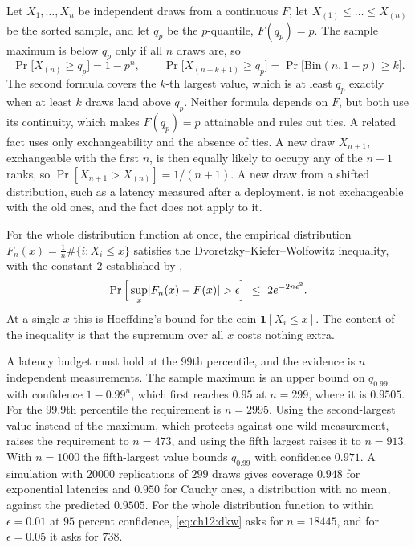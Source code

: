 Let $X_1,\dots,X_n$ be independent draws from a continuous $F$, let $X_{(1)}\le\dots\le X_{(n)}$ be the sorted sample, and let $q_p$ be the $p$-quantile, $F(q_p)=p$. The sample maximum is below $q_p$ only if all $n$ draws are, so
\begin{equation}
\Pr\big[X_{(n)}\ge q_p\big]=1-p^n,
\qquad
\Pr\big[X_{(n-k+1)}\ge q_p\big]=\Pr\big[\mathrm{Bin}(n,1-p)\ge k\big].
\label{eq:ch12:order}
\end{equation}
The second formula covers the $k$-th largest value, which is at least $q_p$ exactly when at least $k$ draws land above $q_p$. Neither formula depends on $F$, but both use its continuity, which makes $F(q_p)=p$ attainable and rules out ties. A related fact uses only exchangeability and the absence of ties. A new draw $X_{n+1}$, exchangeable with the first $n$, is then equally likely to occupy any of the $n+1$ ranks, so $\Pr[X_{n+1}>X_{(n)}]=1/(n+1)$. A new draw from a shifted distribution, such as a latency measured after a deployment, is not exchangeable with the old ones, and the fact does not apply to it.

For the whole distribution function at once, the empirical distribution $F_n(x)=\frac1n\#\{i:X_i\le x\}$ satisfies the Dvoretzky--Kiefer--Wolfowitz inequality, with the constant $2$ established by \citet{massart1990},
\begin{equation}
\Pr\Big[\sup_x\abs{F_n(x)-F(x)}>\epsilon\Big]\ \le\ 2e^{-2n\epsilon^2}.
\label{eq:ch12:dkw}
\end{equation}
At a single $x$ this is Hoeffding's bound for the coin $\mathbf 1[X_i\le x]$. The content of the inequality is that the supremum over all $x$ costs nothing extra.

\begin{example}\label{ex:ch12:p99}
A latency budget must hold at the 99th percentile, and the evidence is $n$ independent measurements. The sample maximum is an upper bound on $q_{0.99}$ with confidence $1-0.99^n$, which first reaches $0.95$ at $n=299$, where it is $0.9505$. For the 99.9th percentile the requirement is $n=2995$. Using the second-largest value instead of the maximum, which protects against one wild measurement, raises the requirement to $n=473$, and using the fifth largest raises it to $n=913$. With $n=1000$ the fifth-largest value bounds $q_{0.99}$ with confidence $0.971$. A simulation with $20000$ replications of $299$ draws gives coverage $0.948$ for exponential latencies and $0.950$ for Cauchy ones, a distribution with no mean, against the predicted $0.9505$. For the whole distribution function to within $\epsilon=0.01$ at $95$ percent confidence, \cref{eq:ch12:dkw} asks for $n=18445$, and for $\epsilon=0.05$ it asks for $738$.
\end{example}

